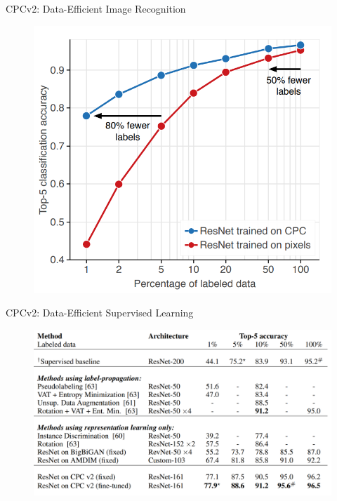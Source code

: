 \begin{frame}[allowframebreaks]{CPCv2: Data-Efficient Image Recognition}
    \begin{figure}
        \centering
        \includegraphics[width=1\linewidth,height=0.9\textheight,keepaspectratio]{images/ssl/slide_61_1_img.png}
    \end{figure}
\end{frame}


\begin{frame}[allowframebreaks]{CPCv2: Data-Efficient Supervised Learning}
    \begin{figure}
        \centering
        \includegraphics[width=1\linewidth,height=0.9\textheight,keepaspectratio]{images/ssl/slide_62_1_img.png}
    \end{figure}
\end{frame}